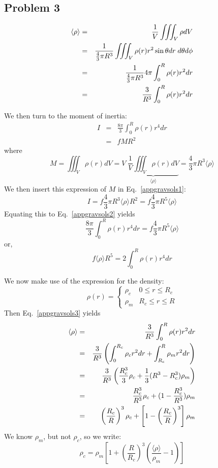 \newpage
\subsection{Problem 3}


\begin{eqnarray}
\langle \rho \rangle 
&=& \frac{1}{V} \iiint_V \rho dV \nonumber\\
&=& \frac{1}{\frac{4}{3}\pi R^3} \iiint_V \rho(r) r^2 \sin\theta dr \; d\theta d\phi \nonumber\\
&=& \frac{1}{\frac{4}{3}\pi R^3}  4\pi \int_0^R \rho(r) r^2  dr \nonumber\\
&=& \frac{3}{R^3}   \int_0^R \rho(r) r^2  dr  \label{appgravsols3}
\end{eqnarray}

We then turn to the moment of inertia:
\begin{eqnarray}
I 
&=& \frac{8\pi}{3} \int_0^R \rho(r) r^4 dr \label{appgravsols2}\\
&=& f M R^2 \label{appgravsols1}
\end{eqnarray}
where 
\[
M 
= \iiint_V \rho(r) dV 
= V \; \underbrace{\frac{1}{V} \iiint_V \rho(r) dV }_{\langle\rho\rangle}
= \frac{4}{3}\pi R^3 \langle\rho\rangle
\]
We then insert this expression of $M$ in Eq.~\eqref{appgravsols1}:
\[
I
= f \frac{4}{3}\pi R^3 \langle\rho\rangle R^2
= f \frac{4}{3}\pi R^5 \langle\rho\rangle 
\]
Equating this to Eq.~\ref{appgravsols2} yields
\[
\frac{8\pi}{3} \int_0^R \rho(r) r^4 dr = f \frac{4}{3}\pi R^5 \langle\rho\rangle
\]
or, 
\begin{equation}
f \langle \rho \rangle R^5 = 2 \int_0^R \rho(r) r^4 dr  \label{appgravsols4}
\end{equation}


We now make use of the expression for the density:
\[
\rho(r) =
\left\{
\begin{array}{ll}
\rho_c & 0\leq r \leq R_c \\
\rho_m & R_c\leq r \leq R 
\end{array}
\right.
\]
Then Eq.~\eqref{appgravsols3} yields
\begin{eqnarray}
\langle \rho \rangle 
&=& \frac{3}{R^3}   \int_0^R \rho(r) r^2  dr \nonumber\\
&=& \frac{3}{R^3} \left(   \int_0^{R_c} \rho_c r^2  dr +  \int_{R_c}^R \rho_m r^2  dr \right) \nonumber\\
&=& \frac{3}{R^3} \left(  \frac{R_c^3}{3} \rho_c  +   \frac{1}{3}(R^3-R_c^3) \rho_m \right) \nonumber\\
&=&   \frac{R_c^3}{R^3} \rho_c  +   (1-\frac{R_c^3}{R^3}) \rho_m  \nonumber\\
&=&   \left(\frac{R_c}{R}\right)^3 \rho_c  +   \left[1-\left(\frac{R_c}{R}\right)^3\right] \rho_m 
\end{eqnarray}
We know $\rho_m$, but not $\rho_c$, so we write:
\begin{equation}
\rho_c 
=\rho_m \left[ 1 + \left(\frac{R}{R_c}\right)^3 \left(\frac{\langle \rho \rangle}{\rho_m} -1\right) \right]
\label{appgravsols5} 
\end{equation}

